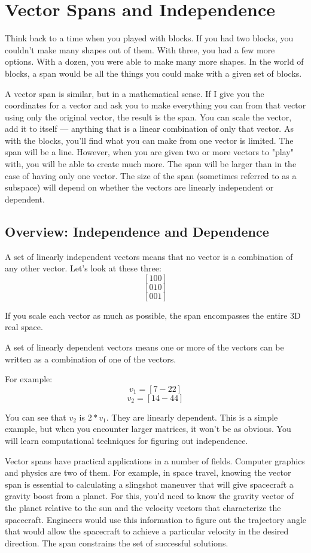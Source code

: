 \chapter{Vector Spans and Independence}
Think back to a time when you played with blocks. If you had two blocks, you couldn't make many shapes out of them. With three, you had a few more options. With a dozen, you were able to make many more shapes. In the world of blocks, a span would be all the things you could make with a given set of blocks. 

A vector span is similar, but in a mathematical sense. If I give you the coordinates for a vector and ask you to make everything you can from that vector using only the original vector, the result is the span. You can scale the vector, add it to itself --- anything that is a linear combination of only that vector. As with the blocks, you'll find what you can make from one vector is limited. The span will be a line. However, when you are given two or more vectors to "play" with, you will be able to create much more. The span will be larger than in the case of having only one vector. The size of the span (sometimes referred to as a subspace) will depend on whether the vectors are linearly independent or dependent. 

\section{Overview: Independence and Dependence}
A set of linearly independent vectors means that no vector is a combination of any other vector. Let's look at these three:
$$[1 0 0]$$
$$[0 1 0]$$
$$[0 0 1]$$

If you scale each vector as much as possible, the span encompasses the entire 3D real space. 

A set of linearly dependent vectors means one or more of the vectors can be written as a combination of one of the vectors.

For example:
$$v_1 = [7 -2 2]$$
$$v_2 = [14 -4 4]$$

You can see that $v_2$ is $2*v_1$. They are linearly dependent. This is a simple example, but when you encounter larger matrices, it won't be as obvious. You will learn computational techniques for figuring out independence.

Vector spans have practical applications in a number of fields. Computer graphics and physics are two of them. For example, in space travel, knowing the vector span is essential to calculating a slingshot maneuver that will give spacecraft a gravity boost from a planet. For this, you'd need to know the gravity vector of the planet relative to the sun and the velocity vectors that characterize the spacecraft. Engineers would use this information to figure out the trajectory angle that would allow the spacecraft to achieve a particular velocity in the desired direction. The span constrains the set of successful solutions.

